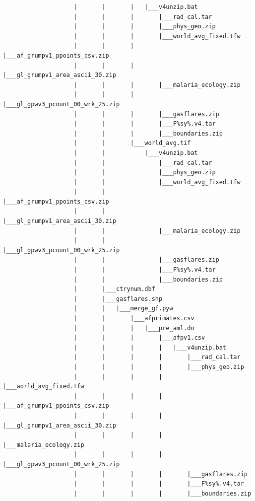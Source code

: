 \documentclass[]{book}
\begin{document}
\begin{verbatim}
                    |       |       |   |___v4unzip.bat
                    |       |       |       |___rad_cal.tar
                    |       |       |       |___phys_geo.zip
                    |       |       |       |___world_avg_fixed.tfw
                    |       |       |       |___af_grumpv1_ppoints_csv.zip
                    |       |       |       |___gl_grumpv1_area_ascii_30.zip
                    |       |       |       |___malaria_ecology.zip
                    |       |       |       |___gl_gpwv3_pcount_00_wrk_25.zip
                    |       |       |       |___gasflares.zip
                    |       |       |       |___F%sy%.v4.tar
                    |       |       |       |___boundaries.zip
                    |       |       |___world_avg.tif
                    |       |           |___v4unzip.bat
                    |       |               |___rad_cal.tar
                    |       |               |___phys_geo.zip
                    |       |               |___world_avg_fixed.tfw
                    |       |               |___af_grumpv1_ppoints_csv.zip
                    |       |               |___gl_grumpv1_area_ascii_30.zip
                    |       |               |___malaria_ecology.zip
                    |       |               |___gl_gpwv3_pcount_00_wrk_25.zip
                    |       |               |___gasflares.zip
                    |       |               |___F%sy%.v4.tar
                    |       |               |___boundaries.zip
                    |       |___ctrynum.dbf
                    |       |___gasflares.shp
                    |       |   |___merge_gf.pyw
                    |       |       |___afprimates.csv
                    |       |       |   |___pre_aml.do
                    |       |       |       |___afpv1.csv
                    |       |       |       |   |___v4unzip.bat
                    |       |       |       |       |___rad_cal.tar
                    |       |       |       |       |___phys_geo.zip
                    |       |       |       |       |___world_avg_fixed.tfw
                    |       |       |       |       |___af_grumpv1_ppoints_csv.zip
                    |       |       |       |       |___gl_grumpv1_area_ascii_30.zip
                    |       |       |       |       |___malaria_ecology.zip
                    |       |       |       |       |___gl_gpwv3_pcount_00_wrk_25.zip
                    |       |       |       |       |___gasflares.zip
                    |       |       |       |       |___F%sy%.v4.tar
                    |       |       |       |       |___boundaries.zip

\end{verbatim}
\end{document}
